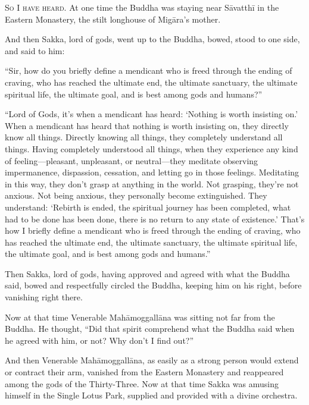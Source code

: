 \documentclass[12pt,openany]{book}%
\newcommand*{\scevam}[1]{\textsc{#1}}
\begin{document}
\scevam{So I have heard. }At one time the Buddha was staying near \textsanskrit{Sāvatthī} in the Eastern Monastery, the stilt longhouse of \textsanskrit{Migāra}’s mother. 

And then Sakka, lord of gods, went up to the Buddha, bowed, stood to one side, and said to him: 

“Sir, how do you briefly define a mendicant who is freed through the ending of craving, who has reached the ultimate end, the ultimate sanctuary, the ultimate spiritual life, the ultimate goal, and is best among gods and humans?” 

“Lord of Gods, it’s when a mendicant has heard: ‘Nothing is worth insisting on.’ When a mendicant has heard that nothing is worth insisting on, they directly know all things. Directly knowing all things, they completely understand all things. Having completely understood all things, when they experience any kind of feeling—pleasant, unpleasant, or neutral—they meditate observing impermanence, dispassion, cessation, and letting go in those feelings. Meditating in this way, they don’t grasp at anything in the world. Not grasping, they’re not anxious. Not being anxious, they personally become extinguished. They understand: ‘Rebirth is ended, the spiritual journey has been completed, what had to be done has been done, there is no return to any state of existence.’ That’s how I briefly define a mendicant who is freed through the ending of craving, who has reached the ultimate end, the ultimate sanctuary, the ultimate spiritual life, the ultimate goal, and is best among gods and humans.” 

Then Sakka, lord of gods, having approved and agreed with what the Buddha said, bowed and respectfully circled the Buddha, keeping him on his right, before vanishing right there. 

Now at that time Venerable \textsanskrit{Mahāmoggallāna} was sitting not far from the Buddha. He thought, “Did that spirit comprehend what the Buddha said when he agreed with him, or not? Why don’t I find out?” 

And then Venerable \textsanskrit{Mahāmoggallāna}, as easily as a strong person would extend or contract their arm, vanished from the Eastern Monastery and reappeared among the gods of the Thirty-Three. Now at that time Sakka was amusing himself in the Single Lotus Park, supplied and provided with a divine orchestra. 
\end{document}
